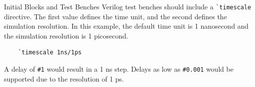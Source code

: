 \documentclass{beamer}
\begin{document}
\begin{frame}[fragile]{Initial Blocks and Test Benches}
	Verilog test benches should include a \texttt{\`{}timescale} directive.
	The first value defines the time unit, and the second defines the simulation resolution.
	In this example, the default time unit is 1 nanosecond and the simulation resolution is 1 picosecond.
	
	\begin{verbatim}
	`timescale 1ns/1ps
	\end{verbatim}

	A delay of \texttt{\#1} would result in a 1 ns step.
	Delays as low as \texttt{\#0.001} would be supported due to the resolution of 1 ps.

\end{frame}
\end{document}
